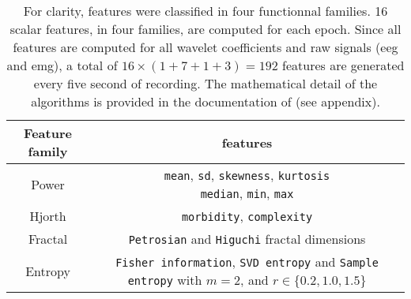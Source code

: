 

\begin {table}[!h]
\begin{center}
\caption{
For clarity, features were classified in four functionnal families.
16 scalar features, in four families, are computed for each epoch.
Since all features are computed for all wavelet coefficients and raw signals (\gls{eeg} and \gls{emg}), a total of 
$16 \times (1+7 + 1 + 3) = 192$ features are generated every five second of recording.
The mathematical detail of the algorithms is provided in the documentation of \pr{} (see appendix).
\label{tab:features}}

\small
\begin{tabular}{|c|c|}
  \hline
  Feature family & features\\
 \hline
 \hline
  Power & \specialcell{\texttt{mean}, \texttt{sd}, \texttt{skewness}, \texttt{kurtosis}\\\texttt{median}, \texttt{min}, \texttt{max}}\\
  \hline
  Hjorth & \texttt{morbidity}, \texttt{complexity}\\
  \hline
  Fractal & \texttt{Petrosian} and \texttt{Higuchi} fractal dimensions\\
  \hline
  Entropy & \specialcell{\texttt{Fisher information}, \texttt{SVD entropy}\\and \texttt{Sample entropy} with $m=2$, and $ r \in \{ 0.2, 1.0, 1.5\}$}\\
 \hline



\end{tabular}
\end{center}
\end{table}

